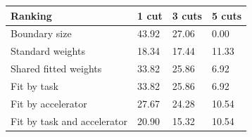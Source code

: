\begin{tabular}{@{}llll@{}}
\toprule
Ranking & 1 cut & 3 cuts & 5 cuts \\
\midrule
Boundary size & 43.92 & 27.06 & 0.00 \\
Standard weights & 18.34 & 17.44 & 11.33 \\
Shared fitted weights & 33.82 & 25.86 & 6.92 \\
Fit by task & 33.82 & 25.86 & 6.92 \\
Fit by accelerator & 27.67 & 24.28 & 10.54 \\
Fit by task and accelerator & 20.90 & 15.32 & 10.54 \\
\bottomrule
\end{tabular}

